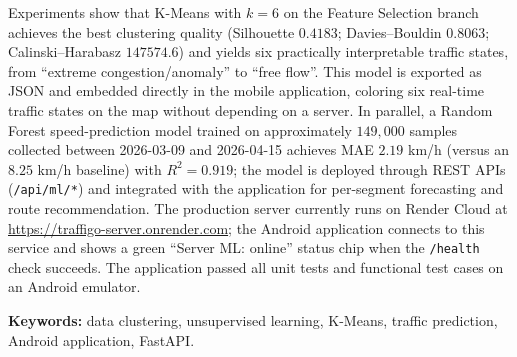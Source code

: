 \documentclass[12pt,a4paper]{report}
\begin{document}
Experiments show that K-Means with $k=6$ on the Feature Selection branch achieves the best clustering quality (Silhouette $0.4183$; Davies--Bouldin $0.8063$; Calinski--Harabasz $147574.6$) and yields six practically interpretable traffic states, from ``extreme congestion/anomaly'' to ``free flow''. This model is exported as JSON and embedded directly in the mobile application, coloring six real-time traffic states on the map without depending on a server. In parallel, a Random Forest speed-prediction model trained on approximately $149{,}000$ samples collected between 2026-03-09 and 2026-04-15 achieves MAE $2.19$ km/h (versus an $8.25$ km/h baseline) with $R^2 = 0.919$; the model is deployed through REST APIs (\texttt{/api/ml/*}) and integrated with the application for per-segment forecasting and route recommendation. The production server currently runs on Render Cloud at \url{https://traffigo-server.onrender.com}; the Android application connects to this service and shows a green ``Server ML: online'' status chip when the \texttt{/health} check succeeds. The application passed all unit tests and functional test cases on an Android emulator.

\textbf{Keywords:} data clustering, unsupervised learning, K-Means, traffic prediction, Android application, FastAPI.

\tableofcontents
\clearpage
{}
\listoffigures
\clearpage
{}
\listoftables

\end{document}
